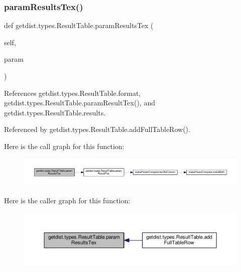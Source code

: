 \subsubsection{\texorpdfstring{param\+Results\+Tex()}{paramResultsTex()}}
{\footnotesize\ttfamily def getdist.\+types.\+Result\+Table.\+param\+Results\+Tex (\begin{DoxyParamCaption}\item[{}]{self,  }\item[{}]{param }\end{DoxyParamCaption})}



References getdist.\+types.\+Result\+Table.\+format, getdist.\+types.\+Result\+Table.\+param\+Result\+Tex(), and getdist.\+types.\+Result\+Table.\+results.



Referenced by getdist.\+types.\+Result\+Table.\+add\+Full\+Table\+Row().

Here is the call graph for this function\+:
\nopagebreak
\begin{figure}[H]
\begin{center}
\leavevmode
\includegraphics[width=350pt]{classgetdist_1_1types_1_1ResultTable_addfef62f3aa37ec0b38785d6cd890595_cgraph}
\end{center}
\end{figure}
Here is the caller graph for this function\+:
\nopagebreak
\begin{figure}[H]
\begin{center}
\leavevmode
\includegraphics[width=350pt]{classgetdist_1_1types_1_1ResultTable_addfef62f3aa37ec0b38785d6cd890595_icgraph}
\end{center}
\end{figure}
\mbox{\label{classgetdist_1_1types_1_1ResultTable_a685e0efc6bb8273a2ea109022fc5da59}} 
